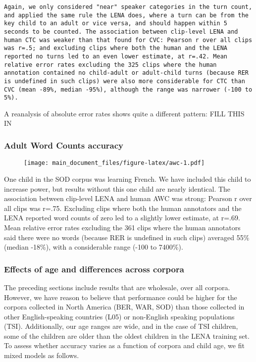 \documentclass[english,floatsintext,man]{apa6}
\begin{document}
\begin{verbatim}
Again, we only considered "near" speaker categories in the turn count, and applied the same rule the LENA does, where a turn can be from the key child to an adult or vice versa, and should happen within 5 seconds to be counted. The association between clip-level LENA and human CTC was weaker than that found for CVC: Pearson r over all clips was r=.5; and excluding clips where both the human and the LENA reported no turns led to an even lower estimate, at r=.42. Mean relative error rates excluding the 325 clips where the human annotation contained no child-adult or adult-child turns (because RER is undefined in such clips) were also more considerable for CTC than CVC (mean -89%, median -95%), although the range was narrower (-100 to 5%).
\end{verbatim}

A reanalysis of absolute error rates shows quite a different pattern:
FILL THIS IN

\subsubsection{Adult Word Counts
accuracy}\label{adult-word-counts-accuracy}

\begin{figure}
\centering
\texttt{[image: main\_document\_files/figure-latex/awc-1.pdf]}
\caption{}
\end{figure}

One child in the SOD corpus was learning French. We have included this
child to increase power, but results without this one child are nearly
identical. The association between clip-level LENA and human AWC was
strong: Pearson r over all clips was r=.75. Excluding clips where both
the human annotators and the LENA reported word counts of zero led to a
slightly lower estimate, at r=.69. Mean relative error rates excluding
the 361 clips where the human annotators said there were no words
(because RER is undefined in such clips) averaged 55\% (median -18\%),
with a considerable range (-100 to 7400\%).

\subsubsection{Effects of age and differences across
corpora}\label{effects-of-age-and-differences-across-corpora}

The preceding sections include results that are wholesale, over all
corpora. However, we have reason to believe that performance could be
higher for the corpora collected in North America (BER, WAR, SOD) than
those collected in other English-speaking countries (L05) or non-English
speaking populations (TSI). Additionally, our age ranges are wide, and
in the case of TSI children, some of the children are older than the
oldest children in the LENA training set. To assess whether accuracy
varies as a function of corpora and child age, we fit mixed models as
follows.
\end{document}
